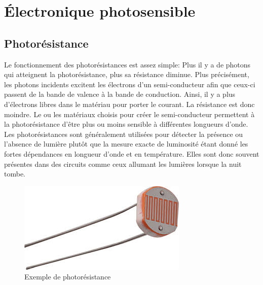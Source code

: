 \documentclass[12pt,oneside,letterpaper]{article}
\begin{document}
\section{Électronique photosensible}

\subsection{Photorésistance}
Le fonctionnement des photorésistances est assez simple: Plus il y a de photons qui atteignent la photorésistance, plus sa résistance diminue. Plus précisément, les photons incidents excitent les électrons d'un semi-conducteur afin que ceux-ci passent de la bande de valence à la bande de conduction. Ainsi, il y a plus d'électrons libres dans le matériau pour porter le courant. La résistance est donc moindre. Le ou les matériaux choisis pour créer le semi-conducteur permettent à la photorésistance d'être plus ou moins sensible à différentes longueurs d'onde. Les photorésistances sont généralement utilisées pour détecter la présence ou l'absence de lumière plutôt que la mesure exacte de luminosité étant donné les fortes dépendances en longueur d'onde et en température. Elles sont donc souvent présentes dans des circuits comme ceux allumant les lumières lorsque la nuit tombe.
\begin{figure}[h]
    \centering
    \includegraphics[scale = 0.4]{Labos-Complements/Lab09/LabDD/Figures/photoresistance.jpg}
    \caption{Exemple de photorésistance}
    \label{fig:enter-label}
\end{figure}
\end{document}
